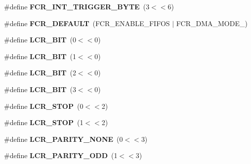 \begin{DoxyCompactItemize}
\item 
\mbox{\label{group__hal__dos_gaed94cd04e976b03515a43d6b8cbf805d}} 
\#define {\bfseries F\+C\+R\+\_\+\+I\+N\+T\+\_\+\+T\+R\+I\+G\+G\+E\+R\+\_\+B\+Y\+TE}~(3$<$$<$6)
\item 
\mbox{\label{group__hal__dos_ga733e75579da0032be20c7fd6ac33944e}} 
\#define {\bfseries F\+C\+R\+\_\+\+D\+E\+F\+A\+U\+LT}~(F\+C\+R\+\_\+\+E\+N\+A\+B\+L\+E\+\_\+\+F\+I\+F\+OS $\vert$ F\+C\+R\+\_\+\+D\+M\+A\+\_\+\+M\+O\+D\+E\+\_)
\item 
\mbox{\label{group__hal__dos_ga4f14e7d3fd79b40ca1405245e0242f3b}} 
\#define {\bfseries L\+C\+R\+\_\+B\+IT}~(0$<$$<$0)
\item 
\mbox{\label{group__hal__dos_ga28e5afbb0dd71482c103d76ba8ccdda6}} 
\#define {\bfseries L\+C\+R\+\_\+B\+IT}~(1$<$$<$0)
\item 
\mbox{\label{group__hal__dos_ga9578b66996a3790b53955c9a42ef43ab}} 
\#define {\bfseries L\+C\+R\+\_\+B\+IT}~(2$<$$<$0)
\item 
\mbox{\label{group__hal__dos_ga11849794cd90dedfc1d211cf948b0a3f}} 
\#define {\bfseries L\+C\+R\+\_\+B\+IT}~(3$<$$<$0)
\item 
\mbox{\label{group__hal__dos_ga766df9edd07ffee6d4c425be00765c14}} 
\#define {\bfseries L\+C\+R\+\_\+S\+T\+OP}~(0$<$$<$2)
\item 
\mbox{\label{group__hal__dos_gace2deeea42a791b868d540cf107da914}} 
\#define {\bfseries L\+C\+R\+\_\+S\+T\+OP}~(1$<$$<$2)
\item 
\mbox{\label{group__hal__dos_ga0a9c31abffbc2246670b81b11937db50}} 
\#define {\bfseries L\+C\+R\+\_\+\+P\+A\+R\+I\+T\+Y\+\_\+\+N\+O\+NE}~(0$<$$<$3)
\item 
\mbox{\label{group__hal__dos_ga8153311f90845501a4dd0befc8e21574}} 
\#define {\bfseries L\+C\+R\+\_\+\+P\+A\+R\+I\+T\+Y\+\_\+\+O\+DD}~(1$<$$<$3)
\item 
\mbox{\label{group__hal__dos_gacda2ab112fb4dbffec4246609d3c1345}} 
$$
\end{DoxyCompactItemize}
